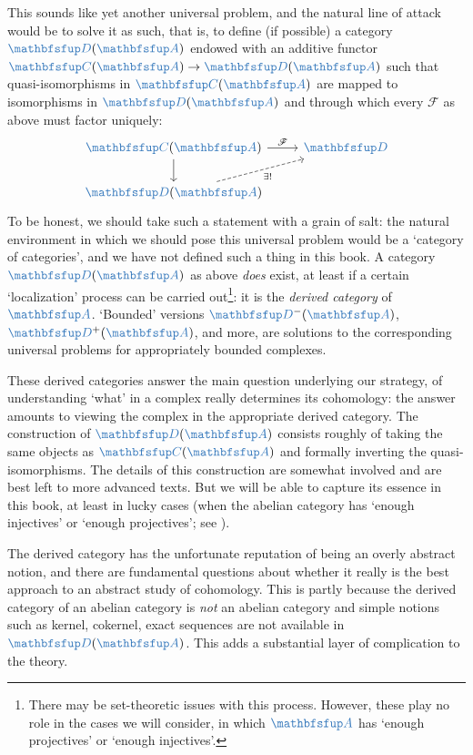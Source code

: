 This sounds like yet another universal problem, and the natural line
of attack would be to solve it as such, that is, to define (if
possible) a category $\categ{D}(\categ{A})$ endowed with an additive
functor $\categ{C}(\categ{A}) \to \categ{D}(\categ{A})$ such that
quasi-isomorphisms in $\categ{C}(\categ{A})$ are mapped to
isomorphisms in $\categ{D}(\categ{A})$ and through which every
$\mathscr{F}$ as above must factor uniquely:
\[\begin{tikzcd}
    \categ{C}(\categ{A}) \arrow[r, "\mathscr{F}"] \arrow[d] & \categ{D} \\
    \categ{D}(\categ{A}) \arrow[ur, dashed, "\exists!"']
  \end{tikzcd}\] To be honest, we should take such a statement with a
grain of salt: the natural environment in which we should pose this
universal problem would be a `category of categories', and we have not
defined such a thing in this book. A category $\categ{D}(\categ{A})$
as above \emph{does} exist, at least if a certain `localization'
process can be carried out\footnote{There may be set-theoretic issues
  with this process. However, these play no role in the cases we will
  consider, in which $\categ{A}$ has `enough projectives' or `enough
  injectives'.}: it is the \emph{derived category} of $\categ{A}$.
`Bounded' versions $\categ{D}^-(\categ{A})$, $\categ{D}^+(\categ{A})$,
and more, are solutions to the corresponding universal problems for
appropriately bounded complexes.

These derived categories answer the main question underlying our
strategy, of understanding `what' in a complex really determines its
cohomology: the answer amounts to viewing the complex in the
appropriate derived category. The construction of
$\categ{D}(\categ{A})$ consists roughly of taking the same objects as
$\categ{C}(\categ{A})$ and formally inverting the
quasi-isomorphisms. The details of this construction are somewhat
involved and are best left to more advanced texts. But we will be able
to capture its essence in this book, at least in lucky cases (when the
abelian category has `enough injectives' or `enough projectives'; see
).

The derived category has the unfortunate reputation of being an overly
abstract notion, and there are fundamental questions about whether it
really is the best approach to an abstract study of cohomology. This
is partly because the derived category of an abelian category is
\emph{not} an abelian category and simple notions such as kernel,
cokernel, exact sequences are not available in
$\categ{D}(\categ{A})$. This adds a substantial layer of complication
to the theory.


